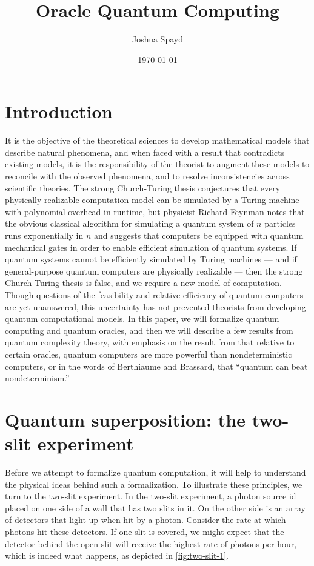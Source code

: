\documentclass[12pt]{article}
\title{Oracle Quantum Computing}
\author{Joshua Spayd}
\date{\today}
\begin{document}
\maketitle

\section{Introduction}
It is the objective of the theoretical sciences to develop mathematical models
that describe natural phenomena, and when faced with a result that contradicts
existing models, it is the responsibility of the theorist to augment these
models to reconcile with the observed phenomena, and to resolve
inconsistencies across scientific theories. The strong Church-Turing thesis
conjectures that every physically realizable computation model can be
simulated by a Turing machine with polynomial overhead in runtime, but
physicist Richard Feynman \cite{Fey82} notes that the obvious classical
algorithm for simulating a quantum system of $n$ particles runs exponentially
in $n$ and suggests that computers be equipped with quantum mechanical gates
in order to enable efficient simulation of quantum systems. If quantum systems
cannot be efficiently simulated by Turing machines --- and if general-purpose
quantum computers are physically realizable --- then the strong Church-Turing
thesis is false, and we require a new model of computation. Though questions
of the feasibility and relative efficiency of quantum computers are yet
unanswered, this uncertainty has not prevented theorists from developing
quantum computational models. In this paper, we will formalize quantum computing
and quantum oracles, and then we will describe a few results from quantum
complexity theory, with emphasis on the result from \cite{BB92} that relative to
certain oracles, quantum computers are more powerful than nondeterministic
computers, or in the words of  Berthiaume and Brassard, that ``quantum can beat
nondeterminism.''


\section{Quantum superposition: the two-slit experiment}
Before we attempt to formalize quantum computation, it will help to understand
the physical ideas behind such a formalization. To illustrate these principles,
we turn to the two-slit experiment. In the two-slit experiment, a photon source
id placed on one side of a wall that has two slits in it. On the other side is
an array of detectors that light up when hit by a photon. Consider the rate at
which photons hit these detectors. If one slit is covered, we might expect that
the detector behind the open slit will receive the highest rate of photons per
hour, which is indeed what happens, as depicted in \cref{fig:two-slit-1}.
\end{document}

